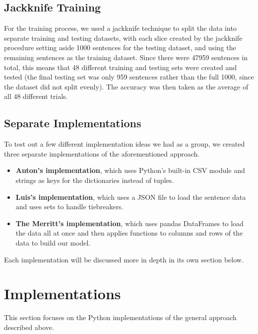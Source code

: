 \documentclass{article}
\begin{document}
\subsection{Jackknife Training}

For the training process, we used a jackknife technique to split the data into separate training and testing datasets, with each slice created by the jackknife procedure
setting aside 1000 sentences for the testing dataset, and using the remaining sentences as the training dataset. Since there were 47959 sentences in total, this means that
48 different training and testing sets were created and tested (the final testing set was only 959 sentences rather than the full 1000, since the dataset did not split evenly).
The accuracy was then taken as the average of all 48 different trials.

\subsection{Separate Implementations}
To test out a few different implementation ideas we had as a group, we created three separate implementations of the aforementioned approach.

\begin{itemize}
    \item \textbf{Anton's implementation}, which uses Python's built-in CSV module and strings as keys for the dictionaries instead of tuples.
    \item \textbf{Luis's implementation}, which uses a JSON file to load the sentence data and uses sets to handle tiebreakers.
    \item \textbf{The Merritt's implementation}, which uses pandas DataFrames to load the data all at once and then applies functions to columns and rows of the data to build our model.
\end{itemize}

Each implementation will be discussed more in depth in its own section below.\\

\section{Implementations}

This section focuses on the Python implementations of the general approach described above.




\end{document}
